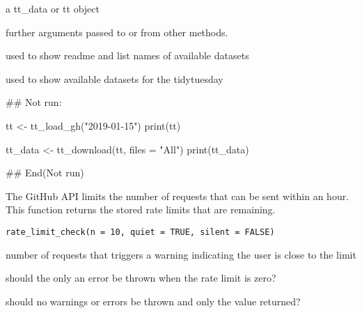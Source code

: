 \documentclass[letterpaper]{book}
\begin{document}
%
\begin{Arguments}
\begin{ldescription}
\item[\code{x}] a tt\_data or tt object

\item[\code{...}] further arguments passed to or from other methods.
\end{ldescription}
\end{Arguments}
%
\begin{Value}
used to show readme and list names of available datasets

used to show available datasets for the tidytuesday
\end{Value}
%
\begin{Examples}
\begin{ExampleCode}

## Not run:

tt <- tt_load_gh("2019-01-15")
print(tt)

tt_data <- tt_download(tt, files = "All")
print(tt_data)


## End(Not run)
\end{ExampleCode}
\end{Examples}
%
\begin{Description}\relax
The GitHub API limits the number of requests that can be sent within an hour.
This function returns the stored rate limits that are remaining.
\end{Description}
%
\begin{Usage}
\begin{verbatim}
rate_limit_check(n = 10, quiet = TRUE, silent = FALSE)
\end{verbatim}
\end{Usage}
%
\begin{Arguments}
\begin{ldescription}
\item[\code{n}] number of requests that triggers a warning indicating the user is
close to the limit

\item[\code{quiet}] should the only an error be thrown when the rate limit is zero?

\item[\code{silent}] should no warnings or errors be thrown and only the value
returned?
\end{ldescription}
\end{Arguments}
\end{document}

